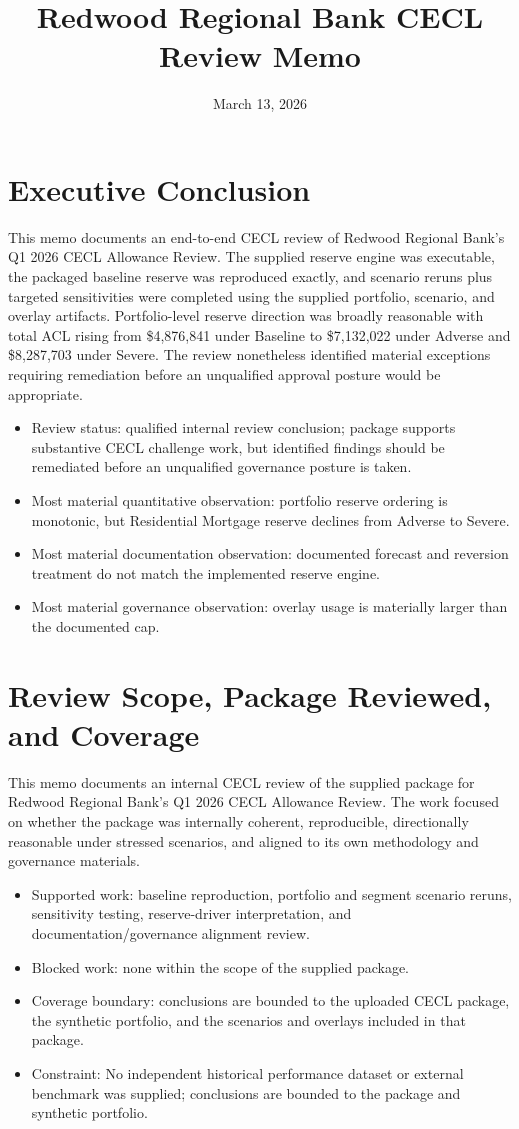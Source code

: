 \documentclass[11pt]{article}
\title{Redwood Regional Bank CECL Review Memo}
\date{March 13, 2026}
\begin{document}
\maketitle
\section*{Executive Conclusion}
This memo documents an end-to-end CECL review of Redwood Regional Bank's Q1 2026 CECL Allowance Review. The supplied reserve engine was executable, the packaged baseline reserve was reproduced exactly, and scenario reruns plus targeted sensitivities were completed using the supplied portfolio, scenario, and overlay artifacts. Portfolio-level reserve direction was broadly reasonable with total ACL rising from \$4,876,841 under Baseline to \$7,132,022 under Adverse and \$8,287,703 under Severe. The review nonetheless identified material exceptions requiring remediation before an unqualified approval posture would be appropriate.
\begin{itemize}
\item Review status: qualified internal review conclusion; package supports substantive CECL challenge work, but identified findings should be remediated before an unqualified governance posture is taken.
\item Most material quantitative observation: portfolio reserve ordering is monotonic, but Residential Mortgage reserve declines from Adverse to Severe.
\item Most material documentation observation: documented forecast and reversion treatment do not match the implemented reserve engine.
\item Most material governance observation: overlay usage is materially larger than the documented cap.
\end{itemize}
\section*{Review Scope, Package Reviewed, and Coverage}
This memo documents an internal CECL review of the supplied package for Redwood Regional Bank's Q1 2026 CECL Allowance Review. The work focused on whether the package was internally coherent, reproducible, directionally reasonable under stressed scenarios, and aligned to its own methodology and governance materials.
\begin{itemize}
\item Supported work: baseline reproduction, portfolio and segment scenario reruns, sensitivity testing, reserve-driver interpretation, and documentation/governance alignment review.
\item Blocked work: none within the scope of the supplied package.
\item Coverage boundary: conclusions are bounded to the uploaded CECL package, the synthetic portfolio, and the scenarios and overlays included in that package.
\item Constraint: No independent historical performance dataset or external benchmark was supplied; conclusions are bounded to the package and synthetic portfolio.
\end{itemize}
\end{document}
